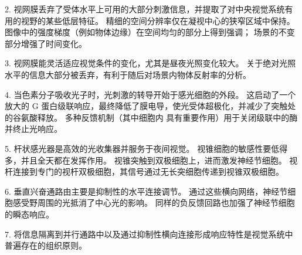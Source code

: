 2. 视网膜丢弃了受体水平上可用的大部分刺激信息，并提取了对中央视觉系统有用的视野的某些低层特征。
精细的空间分辨率仅在凝视中心的狭窄区域中保持。
图像中的强度梯度（例如物体边缘）在空间均匀的部分上得到强调；
场景的不变部分增强了时间变化。


3. 视网膜能灵活适应视觉条件的变化，尤其是昼夜光照变化较大。
关于绝对光照水平的信息大部分被丢弃，有利于随后对场景内物体反射率的分析。 


4. 当色素分子吸收光子时，光刺激的转导开始于感光细胞的外段。
这启动了一个放大的 G 蛋白级联响应，最终降低了膜电导，使光受体超极化，并减少了突触处的谷氨酸释放。 
多种反馈机制（其中细胞内  具有重要作用）用于关闭级联中的酶并终止光响应。


5. 杆状感光器是高效的光收集器并服务于夜间视觉。
视锥细胞的敏感性要低得多，并且全天都在发挥作用。
视锥突触到双极细胞上，进而激发神经节细胞。
视杆连接到专门的视杆双极细胞，其信号通过无长突细胞传递到视锥双极细胞。 


6. 垂直兴奋通路由主要是抑制性的水平连接调节。
通过这些横向网络，神经节细胞感受野周围的光抵消了中心光的影响。
同样的负反馈回路也加强了神经节细胞的瞬态响应。


7. 将信息隔离到并行通路中以及通过抑制性横向连接形成响应特性是视觉系统中普遍存在的组织原则。


